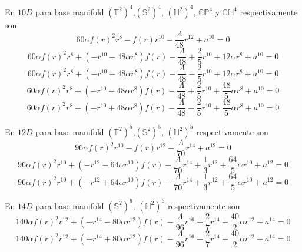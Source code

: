 En $10 D$ para base manifold $(\mathbb{T}^2)^4$,$(\mathbb{S}^2)^4$, $(\mathbb{H}^2)^4$, $\mathbb{CP}^4$ y $\mathbb{CH}^4$ respectivamente son
\begin{equation*}
    60\alpha f(r)^2r^8-f(r)r^{10}-\frac{\Lambda}{48}r^{12}+a^{10}=0
\end{equation*}
\begin{equation*}
    60\alpha f(r)^2r^8+(-r^{10}-48\alpha r^8)f(r)-\frac{\Lambda}{48}+\frac{2}{5}r^{10}+12\alpha r^8+a^{10}=0
\end{equation*}
\begin{equation*}
    60\alpha f(r)^2r^8+(-r^{10}+48\alpha r^8)f(r)-\frac{\Lambda}{48}-\frac{2}{5}r^{10}+12\alpha r^8+a^{10}=0
\end{equation*}
\begin{equation*}
    60\alpha f(r)^2r^8+(-r^{10}-48\alpha r^8)f(r)-\frac{\Lambda}{48}+\frac{2}{5}r^{10}+\frac{48}{5}\alpha r^8+a^{10}=0
\end{equation*}
\begin{equation*}
    60\alpha f(r)^2r^8+(-r^{10}+48\alpha r^8)f(r)-\frac{\Lambda}{48}-\frac{2}{5}r^{10}+\frac{48}{5}\alpha r^8+a^{10}=0
\end{equation*}

En $12 D$ para base manifold $(\mathbb{T}^2)^5$,$(\mathbb{S}^2)^5$, $(\mathbb{H}^2)^5$ respectivamente son
\begin{equation*}
    96\alpha f(r)^2 r^{10}-f(r)r^{12}-\frac{\Lambda}{70}r^{14}+a^{12}=0
\end{equation*}
\begin{equation*}
    96\alpha f(r)^2r^{10}+(-r^{12}-64\alpha r^{10})f(r)-\frac{\Lambda}{70}r^{14}+\frac{1}{3}r^{12}+\frac{64}{5}\alpha r^{10}+a^{12}=0
\end{equation*}
\begin{equation*}
    96\alpha f(r)^2r^{10}+(-r^{12}+64\alpha r^{10})f(r)-\frac{\Lambda}{70}r^{14}+\frac{1}{3}r^{12}+\frac{64}{5}\alpha r^{10}+a^{12}=0
\end{equation*}

En $14 D$ para base manifold $(\mathbb{S}^2)^6$, $(\mathbb{H}^2)^6$ respectivamente son
\begin{equation*}
    140\alpha f(r)^2r^{12}+(-r^{14}-80\alpha r^{12})f(r)-\frac{\Lambda}{96}r^{16}+\frac{2}{7}r^{14}+\frac{40}{2}\alpha r^{12}+a^{14}=0
\end{equation*}
\begin{equation*}
    140\alpha f(r)^2r^{12}+(-r^{14}+80\alpha r^{12})f(r)-\frac{\Lambda}{96}r^{16}-\frac{2}{7}r^{14}+\frac{40}{2}\alpha r^{12}+a^{14}=0
\end{equation*}

